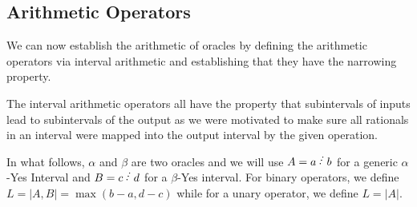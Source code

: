 \documentclass[12pt]{article}
\begin{document}
\subsection{Arithmetic Operators}

We can now establish the arithmetic of oracles by defining the arithmetic operators via interval arithmetic and establishing that they have the narrowing property.

The interval arithmetic operators all have the property that subintervals of inputs lead to subintervals of the output as we were motivated to make sure all rationals in an interval were mapped into the output interval by the given operation. 

In what follows, $\alpha$ and $\beta$ are two oracles and we will use $A=a\lte b$ for a generic $\alpha$-Yes Interval and $B=c\lte d$ for  a $\beta$-Yes interval. For binary operators, we define $L = |A,B| = \max(b-a, d-c)$ while for a unary operator, we define $L = |A|$. 
\end{document}
